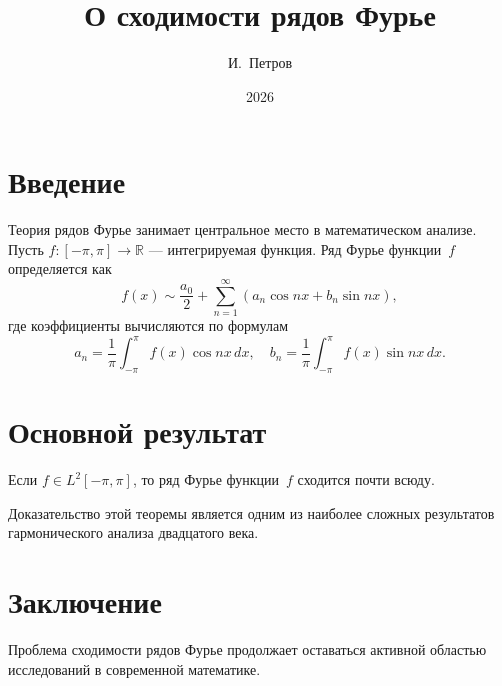 \documentclass{article}
\title{О сходимости рядов Фурье}
\author{И.~Петров}
\date{2026}
\begin{document}
\maketitle

\section{Введение}

Теория рядов Фурье занимает центральное место в математическом анализе.
Пусть $f \colon [-\pi, \pi] \to \mathbb{R}$ --- интегрируемая функция.
Ряд Фурье функции~$f$ определяется как
\[
  f(x) \sim \frac{a_0}{2} + \sum_{n=1}^{\infty} \left(a_n \cos nx + b_n \sin nx\right),
\]
где коэффициенты вычисляются по формулам
\[
  a_n = \frac{1}{\pi}\int_{-\pi}^{\pi} f(x)\cos nx\,dx, \quad
  b_n = \frac{1}{\pi}\int_{-\pi}^{\pi} f(x)\sin nx\,dx.
\]

\section{Основной результат}

\begin{theorem}[Карлесон]
Если $f \in L^2[-\pi,\pi]$, то ряд Фурье функции~$f$ сходится почти всюду.
\end{theorem}

Доказательство этой теоремы является одним из наиболее сложных результатов
гармонического анализа двадцатого века.

\section{Заключение}

Проблема сходимости рядов Фурье продолжает оставаться активной областью
исследований в современной математике.
\end{document}
